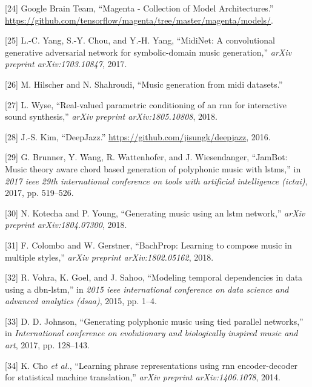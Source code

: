 \documentclass[12pt,]{article}
\begin{document}
\leavevmode\hypertarget{ref-magentamodels}{}%
{[}24{]} \relax Google Brain Team, ``Magenta - Collection of Model
Architectures.'' \\
\url{https://github.com/tensorflow/magenta/tree/master/magenta/models/}.

\leavevmode\hypertarget{ref-yang2017midinet}{}%
{[}25{]} L.-C. Yang, S.-Y. Chou, and Y.-H. Yang, ``MidiNet: A
convolutional generative adversarial network for symbolic-domain music
generation,'' \emph{arXiv preprint arXiv:1703.10847}, 2017.

\leavevmode\hypertarget{ref-hilschermusic}{}%
{[}26{]} M. Hilscher and N. Shahroudi, ``Music generation from midi
datasets.''

\leavevmode\hypertarget{ref-wyse2018real}{}%
{[}27{]} L. Wyse, ``Real-valued parametric conditioning of an rnn for
interactive sound synthesis,'' \emph{arXiv preprint arXiv:1805.10808},
2018.

\leavevmode\hypertarget{ref-kim2016deepjazz}{}%
{[}28{]} J.-S. Kim, ``DeepJazz.''
\url{https://github.com/jisungk/deepjazz}, 2016.

\leavevmode\hypertarget{ref-brunner2017jambot}{}%
{[}29{]} G. Brunner, Y. Wang, R. Wattenhofer, and J. Wiesendanger,
``JamBot: Music theory aware chord based generation of polyphonic music
with lstms,'' in \emph{2017 ieee 29th international conference on tools
with artificial intelligence (ictai)}, 2017, pp. 519--526.

\leavevmode\hypertarget{ref-kotecha2018generating}{}%
{[}30{]} N. Kotecha and P. Young, ``Generating music using an lstm
network,'' \emph{arXiv preprint arXiv:1804.07300}, 2018.

\leavevmode\hypertarget{ref-colombo2018bachprop}{}%
{[}31{]} F. Colombo and W. Gerstner, ``BachProp: Learning to compose
music in multiple styles,'' \emph{arXiv preprint arXiv:1802.05162},
2018.

\leavevmode\hypertarget{ref-vohra2015modeling}{}%
{[}32{]} R. Vohra, K. Goel, and J. Sahoo, ``Modeling temporal
dependencies in data using a dbn-lstm,'' in \emph{2015 ieee
international conference on data science and advanced analytics (dsaa)},
2015, pp. 1--4.

\leavevmode\hypertarget{ref-johnson2017generating}{}%
{[}33{]} D. D. Johnson, ``Generating polyphonic music using tied
parallel networks,'' in \emph{International conference on evolutionary
and biologically inspired music and art}, 2017, pp. 128--143.

\leavevmode\hypertarget{ref-cho2014learning}{}%
{[}34{]} K. Cho \emph{et al.}, ``Learning phrase representations using
rnn encoder-decoder for statistical machine translation,'' \emph{arXiv
preprint arXiv:1406.1078}, 2014.
\end{document}
